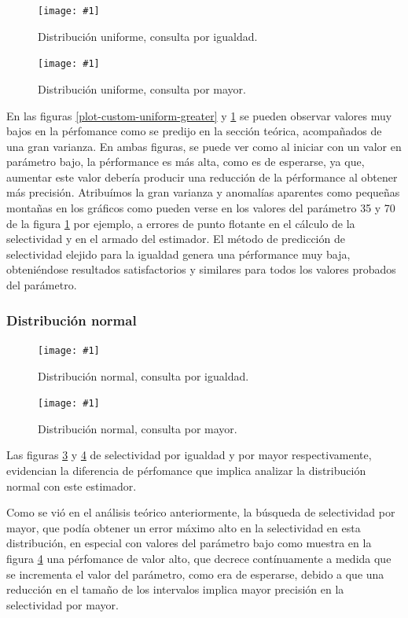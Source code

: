 \documentclass[a4paper, 10pt, twoside]{article}
\newcommand{\grafico}[3]{
  \begin{figure}[H]
    \texttt{[image: \#1]}
    \caption{#2}
    \label{#3}
  \end{figure}
}
\begin{document}
\grafico{plot-hist-uniform-equal}
        {Distribución uniforme, consulta por igualdad.}
        {plot-hist-uniform-equal}
\grafico{plot-hist-uniform-greater}
        {Distribución uniforme, consulta por mayor.}
        {plot-hist-uniform-greater}

En las figuras \ref{plot-custom-uniform-greater} y \ref{plot-hist-uniform-equal} se pueden observar valores muy bajos
en la pérfomance como se predijo en la sección teórica, acompañados de una gran varianza. En ambas figuras, se puede ver como al iniciar con un valor en parámetro bajo,
la pérformance es más alta, como es de esperarse, ya que, aumentar este valor debería producir una reducción de la pérformance al obtener más precisión.
Atribuímos la gran varianza y anomalías aparentes como pequeñas montañas en los gráficos como pueden verse en los
valores del parámetro 35 y 70 de la figura \ref{plot-hist-uniform-equal} por ejemplo, a errores de punto flotante en el cálculo de la selectividad y en el armado del estimador.
El método de predicción de selectividad elejido para la igualdad genera una pérformance muy baja, obteniéndose resultados satisfactorios y similares para todos los valores probados del parámetro.

\subsubsection{Distribución normal}


\grafico{plot-hist-normal-equal}
        {Distribución normal, consulta por igualdad.}
        {plot-hist-normal-equal}
\grafico{plot-hist-normal-greater}
        {Distribución normal, consulta por mayor.}
        {plot-hist-normal-greater}

Las figuras \ref{plot-hist-normal-equal} y \ref{plot-hist-normal-greater} de selectividad por igualdad y por mayor respectivamente, evidencian la diferencia 
de pérfomance que implica analizar la distribución normal con este estimador.

Como se vió en el análisis teórico anteriormente, la búsqueda de selectividad por mayor, que podía obtener un error máximo 
alto en la selectividad en esta distribución, en especial con valores del parámetro bajo como muestra en la figura \ref{plot-hist-normal-greater} una pérfomance de valor alto, que decrece contínuamente a medida que se incrementa el valor del parámetro, como era de esperarse, debido a que una reducción en el tamaño de los intervalos implica mayor precisión en la selectividad por mayor.
\end{document}
